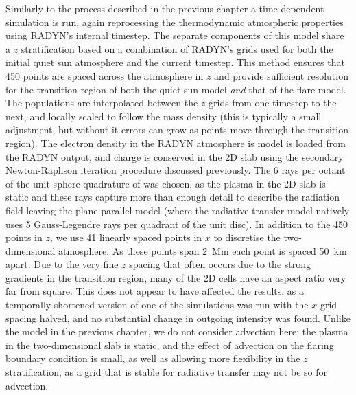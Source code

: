 Similarly to the process described in the previous chapter a time-dependent simulation is run, again reprocessing the thermodynamic atmospheric properties using RADYN's internal timestep.
The separate components of this model share a $z$ stratification based on a combination of RADYN's grids used for both the initial quiet sun atmosphere and the current timestep.
This method ensures that 450 points are spaced across the atmosphere in $z$ and provide sufficient resolution for the transition region of both the quiet sun model \emph{and} that of the flare model.
The populations are interpolated between the $z$ grids from one timestep to the next, and locally scaled to follow the mass density (this is typically a small adjustment, but without it errors can grow as points move through the transition region).
The electron density in the RADYN atmosphere is model is loaded from the RADYN output, and charge is conserved in the 2D slab using the secondary Newton-Raphson iteration procedure discussed previously.
The 6 rays per octant of the unit sphere quadrature of \citet{Stepan2020} was chosen, as the plasma in the 2D slab is static and these rays capture more than enough detail to describe the radiation field leaving the plane parallel model (where the radiative transfer model natively uses 5 Gauss-Legendre rays per quadrant of the unit disc).
In addition to the 450 points in $z$, we use 41 linearly spaced points in $x$ to discretise the two-dimensional atmosphere.
As these points span \SI{2}{\mega\metre} each point is spaced \SI{50}{\kilo\metre} apart.
Due to the very fine $z$ spacing that often occurs due to the strong gradients in the transition region, many of the 2D cells have an aspect ratio very far from square.
This does not appear to have affected the results, as a temporally shortened version of one of the simulations was run with the $x$ grid spacing halved, and no substantial change in outgoing intensity was found.
Unlike the model in the previous chapter, we do not consider advection here; the plasma in the two-dimensional slab is static, and the effect of advection on the flaring boundary condition is small, as well as allowing more flexibility in the $z$ stratification, as a grid that is stable for radiative transfer may not be so for advection.

